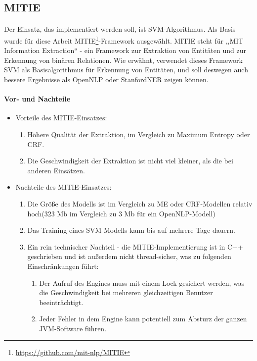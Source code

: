 \subsection{MITIE}
\paragraph{}
Der Einsatz, das implementiert werden soll, ist SVM-Algorithmus. Als Basis wurde für diese Arbeit MITIE\footnote{\url{https://github.com/mit-nlp/MITIE}}-Framework ausgewählt. MITIE steht für ,,MIT Information Extraction`` - ein Framework zur Extraktion von Entitäten und zur Erkennung von binären Relationen. Wie erwähnt, verwendet dieses Framework SVM als Basisalgorithmus für Erkennung von Entitäten, und soll deswegen auch bessere Ergebnisse als OpenNLP oder StanfordNER zeigen können.

\paragraph{Vor- und Nachteile}
\begin{itemize}
\item Vorteile des MITIE-Einsatzes:
\begin{enumerate}
\item Höhere Qualität der Extraktion, im Vergleich zu Maximum Entropy oder CRF.
\item Die Geschwindigkeit der Extraktion ist nicht viel kleiner, als die bei anderen Einsätzen.
\end{enumerate}
\item Nachteile des MITIE-Einsatzes:
\begin{enumerate}
\item Die Größe des Modells ist im Vergleich zu ME oder CRF-Modellen relativ hoch(323 Mb im Vergleich zu 3 Mb für ein OpenNLP-Modell)
\item Das Training eines SVM-Modells kann bis auf mehrere Tage dauern.
\item Ein rein technischer Nachteil - die MITIE-Implementierung ist in C++ geschrieben und ist außerdem nicht thread-sicher, was zu folgenden Einschränkungen führt:
\begin{enumerate}
\item Der Aufruf des Engines muss mit einem Lock gesichert werden, was die Geschwindigkeit bei mehreren gleichzeitigen Benutzer beeinträchtigt.
\item Jeder Fehler in dem Engine kann potentiell zum Absturz der ganzen JVM-Software führen.
\end{enumerate}
\end{enumerate}
\end{itemize}


